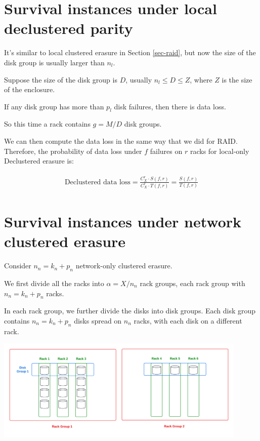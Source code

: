 \documentclass{article}
\begin{document}
\section{Survival instances under local declustered parity}

It's similar to local clustered erasure in Section \ref{sec-raid}, but now the size of the disk group is usually larger than $n_l$. 

Suppose the size of the disk group is $D$, usually $n_l \leq D \leq Z$, where $Z$ is the size of the enclosure.

If any disk group has more than $p_l$ disk failures, then there is data loss.

So this time a rack contains $g = M/D$ disk groups.

We can then compute the data loss in the same way that we did for RAID. Therefore, the probability of data loss under $f$ failures on $r$ racks for local-only Declustered erasure is:

\begin{eqnarray}
\begin{aligned}
\text{Declustered data loss} = \frac{C_{X}^{r} \cdot S(f,r)} 
{C_{X}^{r} \cdot T(f,r)}
= \frac{ S(f,r)} { T(f,r)}
\end{aligned}
\label{eq:dp:1}
\end{eqnarray}


\section{Survival instances under network clustered erasure}

Consider $n_n=k_n+p_n$ network-only clustered erasure.

We first divide all the racks into $\alpha = X / n_n$ rack groups, each rack group with $n_n=k_n+p_n$ racks.

In each rack group, we further divide the disks into disk groups. Each disk group contains $n_n=k_n+p_n$ disks spread on $n_n$ racks, with each disk on a different rack.

\begin{center}
    \includegraphics[width=0.9\textwidth]{netraid_layout.png}
\end{center}
\end{document}
